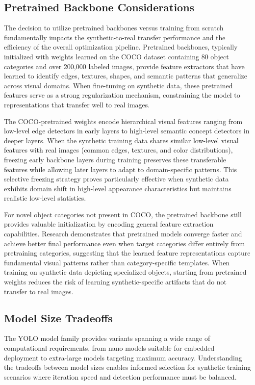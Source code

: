 \subsection{Pretrained Backbone Considerations}

The decision to utilize pretrained backbones versus training from scratch fundamentally impacts the synthetic-to-real transfer performance and the efficiency of the overall optimization pipeline. Pretrained backbones, typically initialized with weights learned on the COCO dataset containing 80 object categories and over 200,000 labeled images, provide feature extractors that have learned to identify edges, textures, shapes, and semantic patterns that generalize across visual domains. When fine-tuning on synthetic data, these pretrained features serve as a strong regularization mechanism, constraining the model to representations that transfer well to real images.

The COCO-pretrained weights encode hierarchical visual features ranging from low-level edge detectors in early layers to high-level semantic concept detectors in deeper layers. When the synthetic training data shares similar low-level visual features with real images (common edges, textures, and color distributions), freezing early backbone layers during training preserves these transferable features while allowing later layers to adapt to domain-specific patterns. This selective freezing strategy proves particularly effective when synthetic data exhibits domain shift in high-level appearance characteristics but maintains realistic low-level statistics.

For novel object categories not present in COCO, the pretrained backbone still provides valuable initialization by encoding general feature extraction capabilities. Research demonstrates that pretrained models converge faster and achieve better final performance even when target categories differ entirely from pretraining categories, suggesting that the learned feature representations capture fundamental visual patterns rather than category-specific templates. When training on synthetic data depicting specialized objects, starting from pretrained weights reduces the risk of learning synthetic-specific artifacts that do not transfer to real images.

\subsection{Model Size Tradeoffs}

The YOLO model family provides variants spanning a wide range of computational requirements, from nano models suitable for embedded deployment to extra-large models targeting maximum accuracy. Understanding the tradeoffs between model sizes enables informed selection for synthetic training scenarios where iteration speed and detection performance must be balanced.

